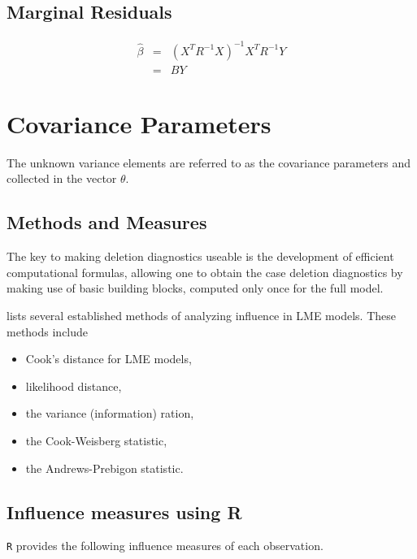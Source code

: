 \documentclass[12pt, a4paper]{article}
\begin{document}
	\subsection{Marginal Residuals}
	\begin{eqnarray}
	\hat{\beta} &=& (X^{T}R^{-1}X)^{-1}X^{T}R^{-1}Y \nonumber \\
	&=& BY \nonumber
	\end{eqnarray}
	
	\newpage
	\section{Covariance Parameters} %
	The unknown variance elements are referred to as the covariance parameters and collected in the vector $\theta$.
	
	\subsection{Methods and Measures}
	The key to making deletion diagnostics useable is the development of efficient computational formulas, allowing one to obtain the  case deletion diagnostics by making use of basic building blocks, computed only once for the full model.
	
	\citet{Zewotir} lists several established methods of analyzing influence in LME models. These methods include \begin{itemize}
		\item Cook's distance for LME models,
		\item {} likelihood distance,
		\item the variance (information) ration,
		\item the  Cook-Weisberg statistic,
		\item the  Andrews-Prebigon statistic.
	\end{itemize}
	
	
	\newpage
	
	
	
	
	
	
	
	
	\subsection{Influence measures using R} %
	\texttt{R} provides the following influence measures of each observation.
	
\end{document}
